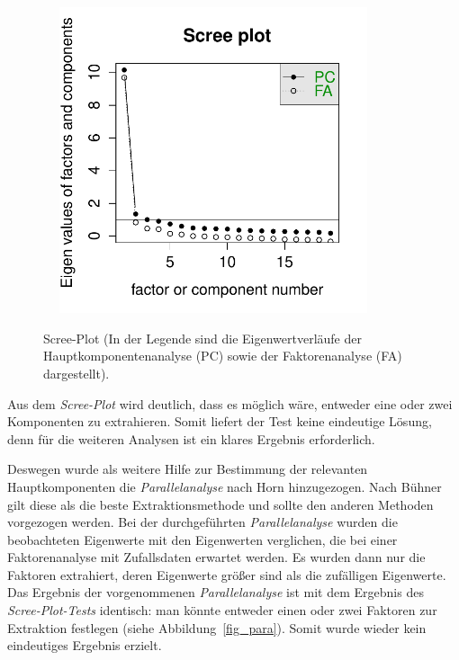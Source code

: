 \documentclass[12pt,a4paper]{article}
\begin{document}
\begin{figure}[h]
\caption{Scree-Plot (In der Legende sind die Eigenwertverläufe der Hauptkomponentenanalyse (PC) sowie der Faktorenanalyse (FA) dargestellt).}
\centering
\includegraphics[scale=0.9,width=10cm, height=9cm]{../R-Berechnungen/Rplot.pdf}
\label{fig_scree}
\end{figure}
									
Aus dem \textit{Scree-Plot} wird deutlich, dass es möglich wäre, entweder eine oder zwei Komponenten zu extrahieren. Somit liefert der Test keine eindeutige Lösung, denn für die weiteren Analysen ist ein klares Ergebnis erforderlich.

	Deswegen wurde als weitere Hilfe zur Bestimmung der relevanten Hauptkomponenten die \textit{Parallelanalyse} nach Horn hinzugezogen. Nach Bühner gilt diese als die beste Extraktionsmethode und sollte den anderen Methoden vorgezogen werden. Bei der durchgeführten \textit{Parallelanalyse} wurden die beobachteten Eigenwerte mit den Eigenwerten verglichen, die bei einer Faktorenanalyse mit Zufallsdaten erwartet werden. Es wurden dann nur die Faktoren extrahiert, deren Eigenwerte größer sind als die zufälligen Eigenwerte. Das Ergebnis der vorgenommenen \textit{Parallelanalyse} ist mit dem Ergebnis des \textit{Scree-Plot-Tests} identisch: man könnte entweder einen oder zwei Faktoren zur Extraktion festlegen (siehe Abbildung~\ref{fig_para}). Somit wurde wieder kein eindeutiges Ergebnis erzielt.
\end{document}

